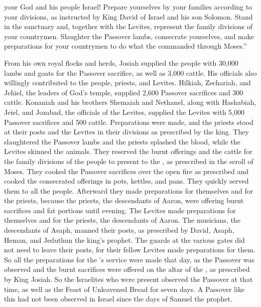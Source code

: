 {{}
your God
and his people
Israel!
Prepare
yourselves by your families
according to your divisions,
as instructed
by King
David
of Israel
and his son
Solomon.
Stand in
the sanctuary
and, together with the Levites,
represent the family
divisions
of your countrymen.
Slaughter
the Passover lambs,
consecrate
yourselves, and make preparations
for your countrymen
to do
what
the {}
commanded through
Moses.”
\par }{\PP {}From his own
royal
flocks
and herds, Josiah
supplied
the people
with 30,000
lambs
and goats
for the Passover sacrifice,
as well as 3,000
cattle.
His officials
also willingly contributed
to the people,
priests,
and Levites.
Hilkiah,
Zechariah,
and Jehiel,
the leaders
of God’s
temple,
supplied
2,600
Passover sacrifices
and 300
cattle.
Konaniah
and his brothers
Shemaiah
and Nethanel,
along with Hashabiah,
Jeiel,
and Jozabad,
the officials
of the Levites,
supplied
the Levites
with 5,000 Passover sacrifices
and 500
cattle.
Preparations
were made,
and the priests
stood
at their posts and the Levites
in their divisions
as prescribed
by the king.
They slaughtered
the Passover lambs
and the priests
splashed
the blood, while the Levites
skinned the animals.
They reserved
the burnt offerings
and the cattle
for the family
divisions
of the people
to present
to the
{}, as prescribed
in the scroll
of Moses.
They cooked
the Passover sacrifices
over the open fire
as prescribed
and cooked
the consecrated
offerings in pots, kettles,
and pans.
They quickly
served them to all
the people.
Afterward
they made preparations
for themselves
and for the priests,
because
the priests,
the descendants
of Aaron,
were offering
burnt sacrifices
and fat
portions until
evening.
The Levites
made preparations
for themselves
and for the priests,
the descendants
of Aaron.
The musicians,
the descendants
of Asaph,
manned
their posts, as prescribed by
David,
Asaph,
Heman,
and Jeduthun
the king’s
prophet.
The guards
at the various
gates
did not
need to leave
their posts,
for
their fellow
Levites
made preparations for them.
So all
the preparations
for the
{}’s
service
were made that day,
as the Passover
was observed
and the burnt sacrifices
were offered
on
the altar
of the {}, as prescribed
by King
Josiah.
So
the Israelites
who were present
observed the Passover
at that time,
as well as the Feast
of Unleavened
Bread for seven
days.
A Passover
like
this had
not
been
observed
in Israel
since the days
of Samuel
the prophet.
}

